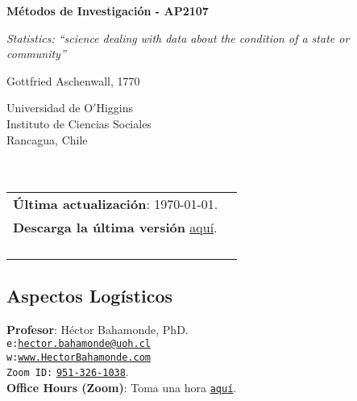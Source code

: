 \documentclass[letterpaper]{article}
\def\name{M\'etodos de Investigaci\'on - AP2107}
\begin{document}

\centerline{\huge \bf \name}

\epigraph{\emph{Statistics: ``science dealing with data about the condition of a state or community''}}{Gottfried Aschenwall, 1770}


\vspace{0.25in}

\begin{minipage}{0.45\linewidth}
 Universidad de O$'$Higgins \\
  Instituto de Ciencias Sociales \\
  Rancagua, Chile\\
  \\
  \\

\end{minipage}
\hspace{4cm}\begin{minipage}{0.45\linewidth}
  \begin{tabular}{ll}
{\bf \'Ultima actualizaci\'on}: \today. \\
 {\bf Descarga la \'ultima versi\'on} \href{https://github.com/hbahamonde/OLS/raw/master/Bahamonde_OLS.pdf}{aqu\'i}.%
    \\
    \\
    \\
    \\
    \\
  \end{tabular}
\end{minipage}



\subsection*{Aspectos Log\'isticos}


\vspace{1mm}
{\bf Profesor}: H\'ector Bahamonde, PhD.\\
\texttt{e:}\href{mailto:hector.bahamonde@uoh.cl}{\texttt{hector.bahamonde@uoh.cl}}\\
\texttt{w:}\href{http://www.hectorbahamonde.com}{\texttt{www.HectorBahamonde.com}}\\
\texttt{Zoom ID:} \href{https://us02web.zoom.us/j/9513261038?pwd=S3BSWXQxZW11NC9CRjRoMmd0TkpEZz09}{\texttt{951-326-1038}}.\\
{\bf Office Hours (Zoom)}: Toma una hora \href{https://calendly.com/bahamonde/officehours}{\texttt{aqu\'i}}.
\end{document}
